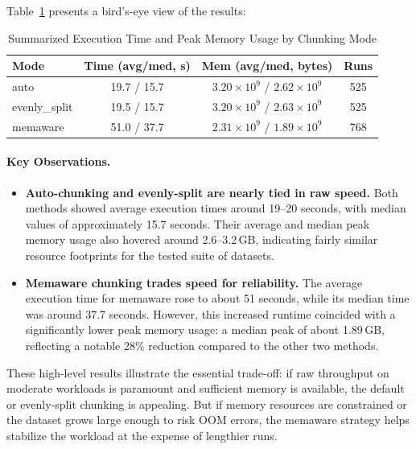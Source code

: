 Table~\ref{tab:mode_summary} presents a bird's-eye view of the results:

\begin{table}[ht]
    \centering
    \caption{Summarized Execution Time and Peak Memory Usage by Chunking Mode}
    \label{tab:mode_summary}
    \begin{tabular}{lccc}
        \toprule
        \textbf{Mode} & \textbf{Time (avg/med, s)} & \textbf{Mem (avg/med, bytes)}             & \textbf{Runs} \\
        \midrule
        auto          & 19.7 / 15.7                & $3.20\times 10^{9}$ / $2.62\times 10^{9}$ & 525           \\
        evenly\_split & 19.5 / 15.7                & $3.20\times 10^{9}$ / $2.63\times 10^{9}$ & 525           \\
        memaware      & 51.0 / 37.7                & $2.31\times 10^{9}$ / $1.89\times 10^{9}$ & 768           \\
        \bottomrule
    \end{tabular}
\end{table}

\paragraph{Key Observations.}
\begin{itemize}
    \item \textbf{Auto-chunking and evenly-split are nearly tied in raw speed.} Both methods showed average execution times around 19--20 seconds, with median values of approximately 15.7 seconds. Their average and median peak memory usage also hovered around 2.6--3.2\,GB, indicating fairly similar resource footprints for the tested suite of datasets.
    \item \textbf{Memaware chunking trades speed for reliability.} The average execution time for memaware rose to about 51 seconds, while its median time was around 37.7 seconds. However, this increased runtime coincided with a significantly lower peak memory usage: a median peak of about 1.89\,GB, reflecting a notable 28\% reduction compared to the other two methods.
\end{itemize}

These high-level results illustrate the essential trade-off: if raw throughput on moderate workloads is paramount and sufficient memory is available, the default or evenly-split chunking is appealing.
But if memory resources are constrained or the dataset grows large enough to risk \ac{OOM} errors, the memaware strategy helps stabilize the workload at the expense of lengthier runs.

